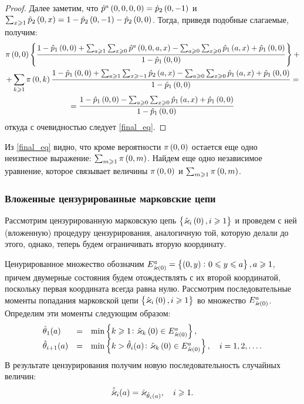 \documentclass[a4paper,14pt,russian]{article}
\newcommand{\Markkhato}[0]{\brrr{ \hat{\vk}_i\br{0}, i \geqslant 1}}
\newcommand{\p}{\hat{p}}
\begin{document}
\begin{proof}
Далее заметим, что $\p^a\br{0,0,0,0} = \p_2\br{0,-1}$ и $\sum_{x\geqslant 1}\p_2 \br{0,x} = 1 - \p_2 \br{0,-1} - \p_2 \br{0,0}$. 
Тогда, приведя подобные слагаемые, получим:
\begin{multline*}
  \pi\br{0,0}\brrr{ \frac{1 - \p_1\br{0,0} + \sum_{a\geqslant 1}\sum_{x\geqslant 0}\p^a\br{0,0,a,x} -
  \sum_{a\geqslant 0}\sum_{x\geqslant 0} \p_1\br{a,x} + \p_1\br{0,0}}{1 - \p_1\br{0,0}} }  + \\ +
\sum_{k \geqslant 1} \pi\br{0,k}\frac{1 - \p_1\br{0,0} + \sum_{a\geqslant 1}\sum_{x\geqslant -1}\p_2\br{a,x}  - \sum_{a\geqslant 0}\sum_{x\geqslant 0}\p_1\br{a,x} + \p_1\br{0,0}}{1 - \p_1\br{0,0}} 
= \\= \frac{1 - \p_1\br{0,0}  - \sum_{a\geqslant 0}\sum_{x\geqslant 0}\p_1\br{a,x} + \p_1\br{0,0}}{1 - \p_1\br{0,0}} 
\end{multline*}
откуда с очевидностью следует \eqref{final_eq}.
\end{proof}

Из \eqref{final_eq} видно, что кроме вероятности $\pi\left(0,0\right)$ остается еще одно неизвестное выражение:
$\sum_{m\geqslant 1}\pi\left(0,m\right)$. Найдем еще одно независимое уравнение, которое связывает величины
 $\pi\left(0,0\right)$ и $\sum_{m\geqslant 1}\pi\left(0,m\right)$.

\subsubsection{Вложенные цензурированные марковские цепи}
Рассмотрим цензурированную марковскую цепь $\Markkhato$ и проведем с ней (вложенную) процедуру цензурирования, аналогичную той, 
которую делали до этого, однако, теперь будем ограничивать вторую координату. 

Ценурированное множество обозначим $E^{a}_{\hat{\varkappa}\left(0\right)}=\left\{\left(0,y\right) \colon 0 \leqslant y \leqslant a\right\}, a\geqslant 1$, причем двумерные состояния будем отождествлять 
с их второй координатой, поскольку первая координата всегда равна нулю. Рассмотрим
последовательные моменты попадания марковской цепи $\Markkhato$ во множество $E^{a}_{\hat{\varkappa}\left(0\right)}$. Определим эти моменты следующим образом:
\begin{equation}
\begin{array}{lll}
\hat{\theta}_1 (a) &=& \min \left\{k \geqslant 1 \colon \hat{\varkappa}_k\left(0\right) \in E^{a}_{\hat{\varkappa}\left(0\right)}\right\},\\
\hat{\theta}_{i+1} (a) &=& \min \left\{k > \hat{\theta}_i (a) \colon \hat{\varkappa}_k\left(0\right) \in E^{a}_{\hat{\varkappa}\left(0\right)}\right\}, \quad i = 1, 2, \ldots.
\end{array}
\label{theta_mark:2}
\end{equation}
В результате цензурирования получим новую последовательность случайных величин:
\begin{equation}
 \hat{\hat{\varkappa}}_i (a)= \hat{\varkappa}_{\hat{\theta}_i (a)}, \quad i \geqslant 1.
 \label{markkhat:2}
\end{equation}
\end{document}

